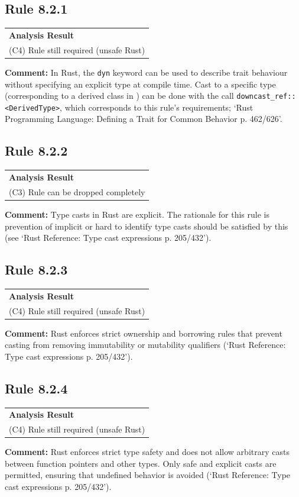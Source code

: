 \subsection*{Rule 8.2.1}
\begin{longtable}{p{13cm}}
\textbf{Analysis Result} \\
(C4) Rule still required (unsafe Rust) \\
\end{longtable}
\textbf{Comment:} In Rust, the \texttt{dyn} keyword can be used to describe trait behaviour without specifying an explicit type at compile time. Cast to a specific type (corresponding to a derived class in \Cpp) can be done with the call \texttt{downcast\_ref::\textless DerivedType\textgreater}, which corresponds to this rule's requirements; `Rust Programming Language: Defining a Trait for Common Behavior p. 462/626'. \\
\subsection*{Rule 8.2.2}
\begin{longtable}{p{13cm}}
\textbf{Analysis Result} \\
(C3) Rule can be dropped completely \\
\end{longtable}
\textbf{Comment:} Type casts in Rust are explicit. The rationale for this rule is prevention of implicit or hard to identify type casts should be satisfied by this (see `Rust Reference: Type cast expressions p. 205/432'). \\
\subsection*{Rule 8.2.3}
\begin{longtable}{p{13cm}}
\textbf{Analysis Result} \\
(C4) Rule still required (unsafe Rust) \\
\end{longtable}
\textbf{Comment:} Rust enforces strict ownership and borrowing rules that prevent casting from removing immutability or mutability qualifiers (`Rust Reference: Type cast expressions p. 205/432'). \\
\subsection*{Rule 8.2.4}
\begin{longtable}{p{13cm}}
\textbf{Analysis Result} \\
(C4) Rule still required (unsafe Rust) \\
\end{longtable}
\textbf{Comment:} Rust enforces strict type safety and does not allow arbitrary casts between function pointers and other types. Only safe and explicit casts are permitted, ensuring that undefined behavior is avoided (`Rust Reference: Type cast expressions p. 205/432'). \\
